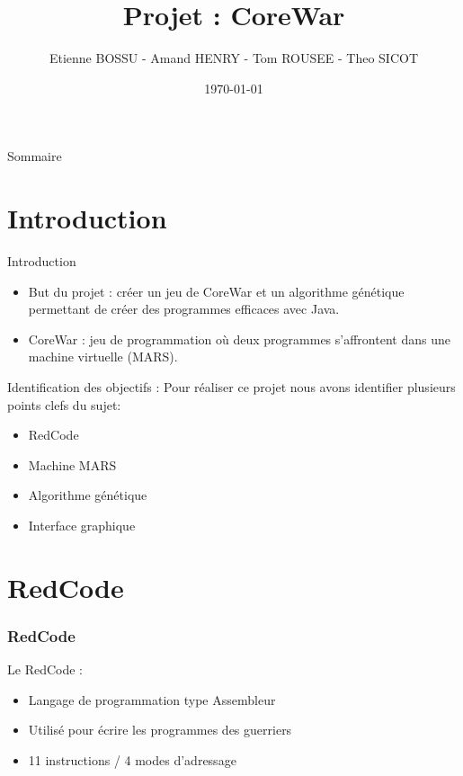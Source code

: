 \documentclass{beamer}
\title{Projet : CoreWar}
\author{Etienne BOSSU - Amand HENRY - Tom ROUSEE - Theo SICOT}
\date{\today}
\begin{document}
\begin{frame}
    \titlepage
\end{frame}

\begin{frame}{Sommaire}
    \tableofcontents
\end{frame}

\section{Introduction}
\begin{frame}{Introduction}
    \begin{itemize}
        \item But du projet : créer un jeu de CoreWar et un algorithme génétique permettant de créer des programmes efficaces avec Java.
        \vspace{\baselineskip}
        \item CoreWar : jeu de programmation où deux programmes s'affrontent dans une machine virtuelle (MARS).
    \end{itemize}
\end{frame}

\begin{frame}{Identification des objectifs :}
    Pour réaliser ce projet nous avons identifier plusieurs points clefs  du sujet:
    \vspace{\baselineskip}
    \begin{itemize}
        \item RedCode
        \item Machine MARS
        \item Algorithme génétique
        \item Interface graphique
    \end{itemize}
\end{frame}

\section{RedCode}
\begin{frame}
    \frametitle{RedCode}
    Le RedCode :
    \begin{itemize}
        \item Langage de programmation type Assembleur
        \item Utilisé pour écrire les programmes des guerriers
        \item 11 instructions / 4 modes d'adressage
    \end{itemize}
\end{frame}
\end{document}
